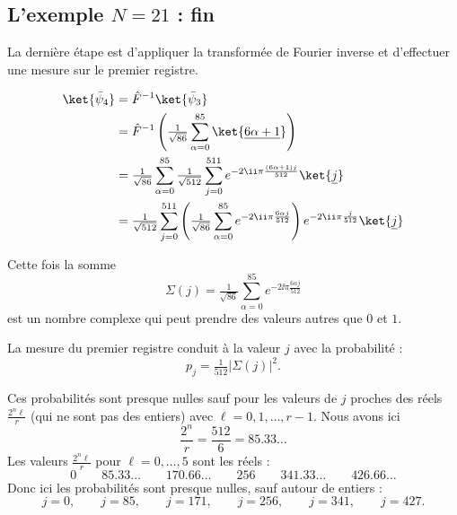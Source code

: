 \documentclass[11pt,class=report,crop=false]{standalone}
\begin{document}
\subsection{L'exemple $N=21$ : fin}

La dernière étape est d'appliquer la transformée de Fourier inverse et d'effectuer une mesure sur le premier registre.

\begin{align*}
\ket{\bar \psi_4}
  &= {\hat F}^{-1} \ket{\bar \psi_3} \\
  &= {\hat F}^{-1} \left( \tfrac{1}{\sqrt{86}} \sum_{\alpha=0}^{85} \ket{\underline{6\alpha + 1}} \right) \\
  &= \tfrac{1}{\sqrt{86}} 
     \sum_{\alpha=0}^{85} \tfrac{1}{\sqrt{512}} 
     \sum_{j=0}^{511} 
     e^{-2\ii \pi \frac{(6\alpha + 1)j}{512}} 
     \ket{\underline j} \\  
&=  \tfrac{1}{\sqrt{512}}
     \sum_{j=0}^{511} 
     \left(
     \tfrac{1}{\sqrt{86}}
     \sum_{\alpha=0}^{85} 
     e^{-2\ii \pi \frac{6\alpha j}{512}} 
     \right) 
     e^{-2\ii \pi \frac{j}{512}} 
     \ket{\underline j} \\   
\end{align*}

Cette fois la somme 
$$\Sigma(j) = \tfrac{1}{\sqrt{86}}
     \sum_{\alpha=0}^{85} 
     e^{-2\ii \pi \frac{6\alpha j}{512}}$$
est un nombre complexe qui peut prendre des valeurs autres que $0$ et $1$.

La mesure du premier registre conduit à la valeur $j$ avec la probabilité :
$$p_j = \tfrac{1}{512} |\Sigma(j)|^2.$$

Ces probabilités sont presque nulles sauf pour les valeurs de $j$ proches des réels
$\frac{2^n\ell}{r}$ (qui ne sont pas des entiers) avec $\ell=0,1,\ldots,r-1$.
Nous avons ici 
$$\frac{2^n}{r} = \frac{512}{6} = 85.33\ldots$$
Les valeurs $\frac{2^n\ell}{r}$ pour $\ell=0,\ldots,5$ sont les réels :
$$0 \qquad 85.33\ldots \qquad 170.66\ldots \qquad 256 \qquad 341.33\ldots \qquad 426.66\ldots$$
Donc ici les probabilités sont presque nulles, sauf autour de entiers :
$$j=0,\qquad j=85,\qquad j=171,\qquad j=256,\qquad j=341,\qquad j=427.$$
\end{document}

